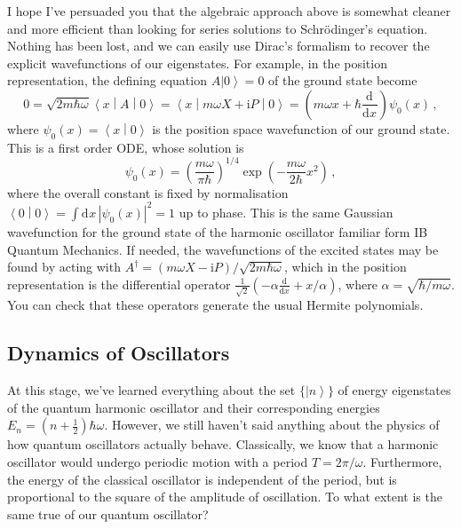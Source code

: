 \documentclass{article}
\theoremstyle{plain}\theoremheaderfont{\normalfont\itshape}\theorembodyfont{\rmfamily}\theoremseparator{.}\newtheorem*{rem}{Remark}\newtheorem*{ex}{Example}\newtheorem*{proof}{Proof}\newtheorem*{altp}{Alternative proof}
\theoremstyle{plain}\theoremheaderfont{\normalfont\bfseries}\theorembodyfont{\rmfamily}\theoremseparator{.}\newtheorem{thm}{Theorem}[section]\newtheorem{lem}[thm]{Lemma}\newtheorem{prop}[thm]{Proposition}\newtheorem*{cor}{Corollary}\newtheorem{defn}[thm]{Definition}\newtheorem{clm}[thm]{Claim}\newtheorem{clminproof}{Claim}
\theoremstyle{break}\theoremheaderfont{\normalfont\itshape}\theorembodyfont{\rmfamily}\theoremseparator{.\medskip}\newtheorem*{proofskip}{Proof}\newtheorem*{exs}{Examples}\newtheorem*{rems}{Remarks}
\theoremstyle{break}\theoremheaderfont{\normalfont\bfseries}\theorembodyfont{\rmfamily}\theoremseparator{.\medskip}\newtheorem{lemskip}[thm]{Lemma}\newtheorem{defnskip}[thm]{Definition}\newtheorem{propskip}[thm]{Proposition}\newtheorem{thmskip}[thm]{Theorem}
\numberwithin{equation}{section}
\newcommand{\ii}{\mathrm{i}}
\newcommand{\dd}[2][]{\mathrm{d}^{#1} #2\,}
\newcommand{\dv}[3][]{\frac{\mathrm{d}^{#1} #2}{{\mathrm{d} #3}^{#1}}}
\newcommand{\ket}[1]{\left| #1 \right\rangle}
\newcommand{\braket}[2]{\left\langle #1 \middle| #2 \right\rangle}
\newcommand{\mel}[3]{\left\langle #1 \middle| #2 \middle| #3 \right\rangle}
\newcommand{\vb}[1]{\bm{\mathrm{#1}}}
\newcommand{\abs}[1]{\left| #1 \right|}
\begin{document}
    I hope I've persuaded you that the algebraic approach above is somewhat cleaner and more efficient than looking for series solutions to Schr\"{o}dinger's equation. Nothing has been lost, and we can easily use Dirac's formalism to recover the explicit wavefunctions of our eigenstates. For example, in the position representation, the defining equation \(A\ket{0}=\vb{0}\) of the ground state become
    \begin{equation}
        0=\sqrt{2m\hbar\omega}\mel{x}{A}{0}=\mel{x}{m\omega X+\ii P}{0}=\left(m\omega x+\hbar\dv{}{x}\right)\psi_0(x)\,,
    \end{equation}
    where \(\psi_0(x)=\braket{x}{0}\) is the position space wavefunction of our ground state. This is a first order ODE, whose solution is
    \begin{equation}
        \psi_0(x)=\left(\frac{m\omega}{\pi\hbar}\right)^{1/4}\exp(-\frac{m\omega}{2\hbar}x^2)\,,
    \end{equation}
    where the overall constant is fixed by normalisation \(\braket{0}{0}=\int\dd{x}\abs{\psi_0(x)}^2=1\) up to phase. This is the same Gaussian wavefunction for the ground state of the harmonic oscillator familiar form IB Quantum Mechanics. If needed, the wavefunctions of the excited states may be found by acting with \(A^\dagger=(m\omega X-\ii P)/\sqrt{2m\hbar\omega}\), which in the position representation is the differential operator \(\frac{1}{\sqrt{2}}(-\alpha\dv{}{x}+x/\alpha)\), where \(\alpha=\sqrt{\hbar/m\omega}\). You can check that these operators generate the usual Hermite polynomials.
    
    \subsection{Dynamics of Oscillators}
    At this stage, we've learned everything about the set \(\{\ket{n}\}\) of energy eigenstates of the quantum harmonic oscillator and their corresponding energies \(E_n=(n+\frac{1}{2})\hbar\omega\). However, we still haven't said anything about the physics of how quantum oscillators actually behave. Classically, we know that a harmonic oscillator would undergo periodic motion with a period \(T=2\pi/\omega\). Furthermore, the energy of the classical oscillator is independent of the period, but is proportional to the square of the amplitude of oscillation. To what extent is the same true of our quantum oscillator?
\end{document}
